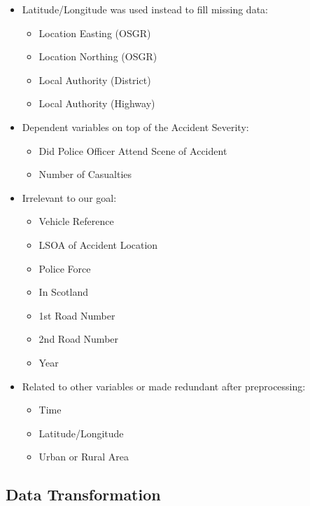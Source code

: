 \begin{itemize}
    \item Latitude/Longitude was used instead to fill missing data:
    \begin{itemize}
        \item Location Easting (OSGR)
        \item Location Northing (OSGR)
        \item Local Authority (District)
        \item Local Authority (Highway)
        \end{itemize}
    \item Dependent variables on top of the Accident Severity:
    \begin{itemize}
        \item Did Police Officer Attend Scene of Accident
        \item Number of Casualties
    \end{itemize}
    \item Irrelevant to our goal:
    \begin{itemize}
        \item Vehicle Reference
        \item LSOA of Accident Location
        \item Police Force
        \item In Scotland
        \item 1st Road Number
        \item 2nd Road Number
        \item Year
    \end{itemize}
    \item Related to other variables or made redundant after preprocessing:
    \begin{itemize}
        \item Time
        \item Latitude/Longitude
        \item Urban or Rural Area
    \end{itemize}
\end{itemize}

\subsection{Data Transformation}\label{subsec:data-transformation}

